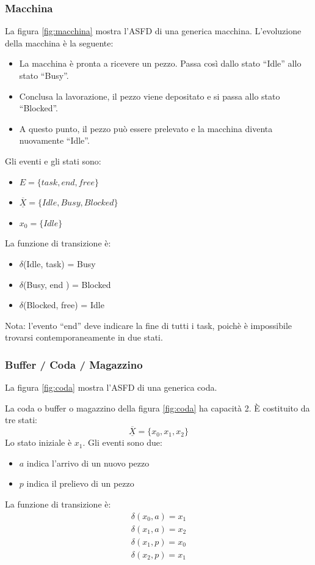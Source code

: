 \documentclass[a4paper]{report}
\begin{document}
\subsubsection{Macchina}
La figura \ref{fig:macchina} mostra l'ASFD di una generica
macchina. L'evoluzione della macchina \`e la seguente:
\begin{itemize}
\item La macchina \`e pronta a ricevere un pezzo. Passa cos\`i dallo
  stato ``Idle'' allo stato ``Busy''.
\item Conclusa la lavorazione, il pezzo viene depositato e si passa
  allo stato ``Blocked''.
\item A questo punto, il pezzo pu\`o essere prelevato e la macchina
  diventa nuovamente ``Idle''.
\end{itemize}

Gli eventi e gli stati sono:
\begin{itemize}
\item $E = \{ task, end, free \}$
\item $\overline{\underline{X}} = \{ Idle, Busy, Blocked\}$
\item $x_0 = \{ Idle\}$
\end{itemize}

La funzione di transizione \`e:
\begin{itemize}
\item $\delta$(Idle, task) = Busy
\item $\delta$(Busy, end ) = Blocked
\item $\delta$(Blocked, free) = Idle
\end{itemize}
Nota: l'evento ``end'' deve indicare la fine di tutti i task, poich\`e
\`e impossibile trovarsi contemporaneamente in due stati.

\subsubsection{Buffer / Coda / Magazzino}
La figura \ref{fig:coda} mostra l'ASFD di una generica coda.

La coda o buffer o magazzino della figura \ref{fig:coda} ha capacit\`a
2. \`E costituito da tre stati:
\[
\overline{\underline{X}} = \{ x_0, x_1, x_2\}
\]
Lo stato iniziale \`e $x_1$. Gli eventi sono due:
\begin{itemize}
\item $a$ indica l'arrivo di un nuovo pezzo
\item $p$ indica il prelievo di un pezzo
\end{itemize}
La funzione di transizione \`e:
\[
\begin{array}{l}
  \delta(x_0, a) = x_1\\
  \delta(x_1, a) = x_2\\
  \delta(x_1, p) = x_0\\
  \delta(x_2, p) = x_1
\end{array}
\]
\end{document}
